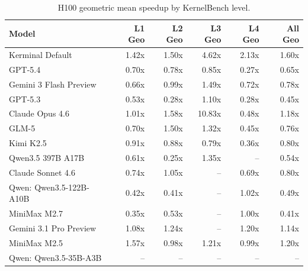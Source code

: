 \begin{table}[t]
\centering
\small
\caption{H100 geometric mean speedup by KernelBench level.}
\label{tab:h100-level-speed}
\begin{tabular}{lrrrrr}
\toprule
Model & L1 Geo & L2 Geo & L3 Geo & L4 Geo & All Geo \\
\midrule
Kerminal Default & 1.42x & 1.50x & 4.62x & 2.13x & 1.60x \\
GPT-5.4 & 0.70x & 0.78x & 0.85x & 0.27x & 0.65x \\
Gemini 3 Flash Preview & 0.66x & 0.99x & 1.49x & 0.72x & 0.78x \\
GPT-5.3 & 0.53x & 0.28x & 1.10x & 0.28x & 0.45x \\
Claude Opus 4.6 & 1.01x & 1.58x & 10.83x & 0.48x & 1.18x \\
GLM-5 & 0.70x & 1.50x & 1.32x & 0.45x & 0.76x \\
Kimi K2.5 & 0.91x & 0.88x & 0.79x & 0.36x & 0.80x \\
Qwen3.5 397B A17B & 0.61x & 0.25x & 1.35x & -- & 0.54x \\
Claude Sonnet 4.6 & 0.74x & 1.05x & -- & 0.69x & 0.80x \\
Qwen: Qwen3.5-122B-A10B & 0.42x & 0.41x & -- & 1.02x & 0.49x \\
MiniMax M2.7 & 0.35x & 0.53x & -- & 1.00x & 0.41x \\
Gemini 3.1 Pro Preview & 1.08x & 1.24x & -- & 1.20x & 1.14x \\
MiniMax M2.5 & 1.57x & 0.98x & 1.21x & 0.99x & 1.20x \\
Qwen: Qwen3.5-35B-A3B & -- & -- & -- & -- & -- \\
\bottomrule
\end{tabular}
\end{table}
